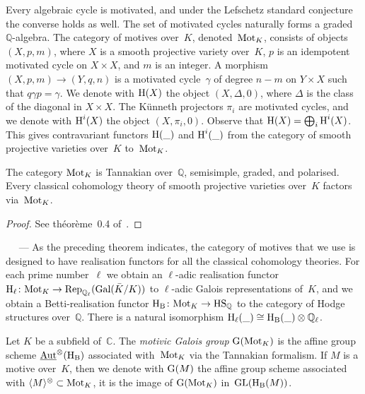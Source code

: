 \documentclass[10pt,twoside,leqno]{article}
\renewcommand{\paragraph}[1]{\par\bigskip\refstepcounter{subsection}%
 {\normalfont\normalsize\scshape\noindent\thesubsection%
 \ifthenelse{\equal{#1}{}}%
 {}%
 {\ \textls{#1.}}%
 \ ---}%
}
\numberwithin{equation}{subsection}
\newcommand{\Aut}{\textnormal{Aut}}
\newcommand{\iAut}{\underline{\Aut}}
\newcommand{\QQ}{\mathbb{Q}}
\newcommand{\QQl}{\QQ_{\ell}}
\newcommand{\CC}{\mathbb{C}}
\newcommand{\Gal}{\textnormal{Gal}}
\newcommand{\Rep}{\textnormal{Rep}}
\newcommand{\GL}{\textnormal{GL}}
\newcommand{\HH}{\textnormal{H}}
\newcommand{\Hl}{\HH_{\ell}}
\newcommand{\HB}{\HH_{\textnormal{B}}}
\newcommand{\Mot}{\textnormal{Mot}}
\newcommand{\GG}{\textnormal{G}}
\newcommand{\HS}{\textnormal{HS}}
\newcommand{\Tangen}[1]{\langle #1 \rangle^{\otimes}}
\begin{document}
Every algebraic cycle is motivated,
and under the Lefschetz standard conjecture the converse holds as well.
The set of motivated cycles naturally forms a graded $\QQ$-algebra.
The category of motives over~$K$, denoted~$\Mot_K$,
consists of objects $(X,p,m)$,
where $X$ is a smooth projective variety over~$K$,
$p$ is an idempotent motivated cycle on $X \times X$,
and $m$ is an integer.
A morphism $(X,p,m) \to (Y,q,n)$
is a motivated cycle~$\gamma$ of degree $n-m$ on $Y \times X$
such that $q \gamma p = \gamma$.
We denote with $\HH(X)$ the object $(X,\Delta,0)$,
where $\Delta$ is the class of the diagonal in $X \times X$.
The K\"unneth projectors $\pi_i$ are motivated cycles,
and we denote with $\HH^i(X)$ the object $(X,\pi_i,0)$.
Observe that $\HH(X) = \bigoplus_i \HH^i(X)$.
This gives contravariant functors $\HH(\_)$ and $\HH^i(\_)$
from the category of smooth projective varieties over~$K$ to~$\Mot_K$.

\begin{theorem}
 The category $\Mot_K$ is Tannakian over~$\QQ$,
 semisimple, graded, and polarised.
 Every classical cohomology theory of smooth projective varieties over~$K$
 factors via~$\Mot_K$.
 \begin{proof}
  See th\'eor\`eme~0.4 of~\cite{An95}.
 \end{proof}
\end{theorem}

\paragraph{} %
As the preceding theorem indicates,
the category of motives that we use is designed to have realisation functors
for all the classical cohomology theories.
For each prime number~$\ell$
we obtain an $\ell$-adic realisation functor
$\Hl \colon \Mot_K \to \Rep_{\QQl}(\Gal(\bar K/K))$
to $\ell$-adic Galois representations of~$K$,
and we obtain a Betti-realisation functor
$\HB \colon \Mot_K \to \HS_\QQ$
to the category of Hodge structures over~$\QQ$.
There is a natural isomorphism $\Hl(\_) \cong \HB(\_) \otimes \QQl$.

\begin{definition}
 Let $K$ be a subfield of~$\CC$.
 The \emph{motivic Galois group} $\GG(\Mot_K)$
 is the affine group scheme $\iAut^\otimes(\HB)$
 associated with~$\Mot_K$ via the Tannakian formalism.
 If $M$ is a motive over~$K$, then we denote with $\GG(M)$
 the affine group scheme associated with $\Tangen{M} \subset \Mot_K$,
 it is the image of $\GG(\Mot_K)$ in~$\GL(\HB(M))$.
\end{definition}
\end{document}
